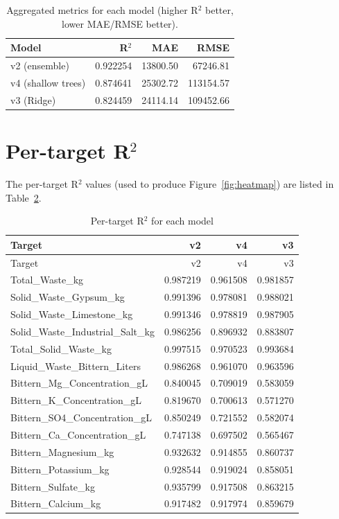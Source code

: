 \documentclass[11pt,a4paper]{article}
\begin{document}
\begin{table}[ht]
\centering
\caption{Aggregated metrics for each model (higher R$^2$ better, lower MAE/RMSE better).}
\label{tab:agg}
\begin{tabular}{lrrr}
\toprule
Model & R$^2$ & MAE & RMSE \\
\midrule
v2 (ensemble) & 0.922254 & 13800.50 & 67246.81 \\
v4 (shallow trees) & 0.874641 & 25302.72 & 113154.57 \\
v3 (Ridge) & 0.824459 & 24114.14 & 109452.66 \\
\bottomrule
\end{tabular}
\end{table}

\section{Per-target R$^2$}
The per-target R$^2$ values (used to produce Figure~\ref{fig:heatmap}) are listed in Table~\ref{tab:per_target}.

\begin{longtable}{lrrr}
\caption{Per-target R$^2$ for each model}\label{tab:per_target}\\
\toprule
Target & v2 & v4 & v3 \\
\midrule
\endfirsthead
\toprule
Target & v2 & v4 & v3 \\
\midrule
\endhead
Total\_Waste\_kg & 0.987219 & 0.961508 & 0.981857 \\
Solid\_Waste\_Gypsum\_kg & 0.991396 & 0.978081 & 0.988021 \\
Solid\_Waste\_Limestone\_kg & 0.991346 & 0.978819 & 0.987905 \\
Solid\_Waste\_Industrial\_Salt\_kg & 0.986256 & 0.896932 & 0.883807 \\
Total\_Solid\_Waste\_kg & 0.997515 & 0.970523 & 0.993684 \\
Liquid\_Waste\_Bittern\_Liters & 0.986268 & 0.961070 & 0.963596 \\
Bittern\_Mg\_Concentration\_gL & 0.840045 & 0.709019 & 0.583059 \\
Bittern\_K\_Concentration\_gL & 0.819670 & 0.700613 & 0.571270 \\
Bittern\_SO4\_Concentration\_gL & 0.850249 & 0.721552 & 0.582074 \\
Bittern\_Ca\_Concentration\_gL & 0.747138 & 0.697502 & 0.565467 \\
Bittern\_Magnesium\_kg & 0.932632 & 0.914855 & 0.860737 \\
Bittern\_Potassium\_kg & 0.928544 & 0.919024 & 0.858051 \\
Bittern\_Sulfate\_kg & 0.935799 & 0.917508 & 0.863215 \\
Bittern\_Calcium\_kg & 0.917482 & 0.917974 & 0.859679 \\
\bottomrule
\end{longtable}
\end{document}
